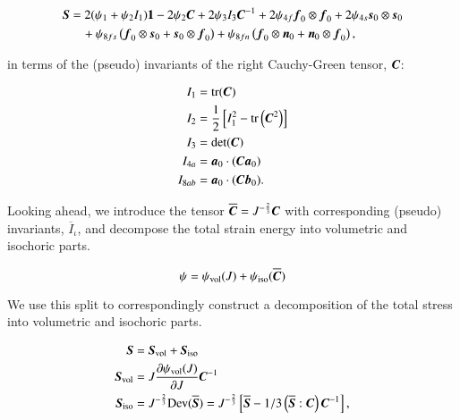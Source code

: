 \begin{equation}
  \begin{split}
    \mbox{\boldmath$ S$} &=   2 (\psi_{1} + \psi_{2} I_{1}) {\bf 1}
           - 2 \psi_{2} \mbox{\boldmath$ C$}
                + 2 \psi_{3} I_{3} \mbox{\boldmath$ C$}^{-1}
                + 2 \psi_{4f} \mbox{\boldmath$ f$}_{0}\otimes\mbox{\boldmath$ f$}_{0}
                + 2 \psi_{4s} \mbox{\boldmath$ s$}_{0}\otimes\mbox{\boldmath$ s$}_{0}\\
        &\quad  + \psi_{8fs} \left( \mbox{\boldmath$ f$}_{0}\otimes\mbox{\boldmath$ s$}_{0} + \mbox{\boldmath$ s$}_{0}\otimes\mbox{\boldmath$ f$}_{0} \right)
                + \psi_{8fn} \left( \mbox{\boldmath$ f$}_{0}\otimes\mbox{\boldmath$ n$}_{0} + \mbox{\boldmath$ n$}_{0}\otimes\mbox{\boldmath$ f$}_{0} \right),
  \end{split}
  \label{second-piola-kirchhoff-stress}
\end{equation}

\noindent in terms of the (pseudo) invariants of the right
Cauchy-Green tensor, $\mbox{\boldmath$ C$}$:

\begin{equation}
  \begin{split}
    I_{1} &= \mathrm{tr}(\mbox{\boldmath$ C$})\\
    I_{2} &= \frac{1}{2}\left[I_{1}^{2} - \mathrm{tr}\left(\mbox{\boldmath$ C$}^{2}\right)\right]\\
    I_{3} &= \mathrm{det}(\mbox{\boldmath$ C$})\\
    I_{4a} &= \mbox{\boldmath$ a$}_{0}\cdot(\mbox{\boldmath$ C$}\mbox{\boldmath$ a$}_{0})\\
    I_{8ab} &= \mbox{\boldmath$ a$}_{0}\cdot(\mbox{\boldmath$ C$}\mbox{\boldmath$ b$}_{0}).
  \end{split}
\end{equation}

Looking ahead, we introduce the tensor $\overline{\mbox{\boldmath$ C$}} =
J^{-\frac{2}{3}} \mbox{\boldmath$ C$}$ with corresponding (pseudo) invariants,
$\overline{I}_{\iota}$, and decompose the total strain energy into
volumetric and isochoric parts.

\begin{equation}
  \psi = \psi_{\mathrm{vol}}(J) + \psi_{\mathrm{iso}}(\overline{\mbox{\boldmath$ C$}})
\end{equation}

\noindent We use this split to correspondingly construct a
decomposition of the total stress into volumetric and isochoric parts.

\begin{equation}
  \begin{split}
    \mbox{\boldmath$ S$} &= \mbox{\boldmath$ S$}_{\mathrm{vol}} + \mbox{\boldmath$ S$}_{\mathrm{iso}}\\
    \mbox{\boldmath$ S$}_{\mathrm{vol}} &= J \frac{\partial \psi_{\mathrm{vol}}(J)}{\partial J} \mbox{\boldmath$ C$}^{-1}\\
    \mbox{\boldmath$ S$}_{\mathrm{iso}} &= J^{-\frac{2}{3}} \mathrm{Dev}(\overline{\mbox{\boldmath$ S$}}) = J^{-\frac{2}{3}}
    \left[\overline{\mbox{\boldmath$ S$}} - 1/3 \left(\overline{\mbox{\boldmath$ S$}}:\mbox{\boldmath$ C$}\right)\mbox{\boldmath$ C$}^{-1}\right],
  \end{split}
\end{equation}

